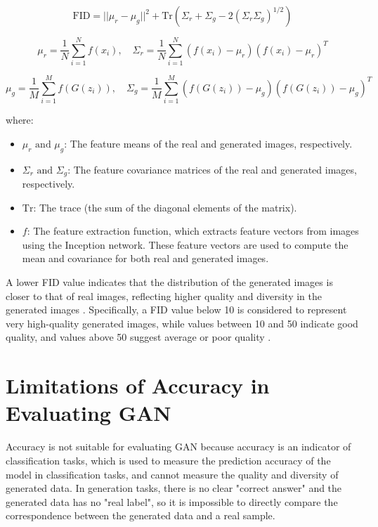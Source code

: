 \begin{equation}
    \text{FID} = || \mu_r - \mu_g ||^2 + \text{Tr}(\Sigma_r + \Sigma_g - 2(\Sigma_r \Sigma_g)^{1/2})
\end{equation}

\begin{equation}
    \mu_r = \frac{1}{N} \sum_{i=1}^{N} f(x_i), \quad \Sigma_r = \frac{1}{N} \sum_{i=1}^{N} (f(x_i) - \mu_r)(f(x_i) - \mu_r)^T
\end{equation}

\begin{equation}
    \mu_g = \frac{1}{M} \sum_{i=1}^{M} f(G(z_i)), \quad \Sigma_g = \frac{1}{M} \sum_{i=1}^{M} (f(G(z_i)) - \mu_g)(f(G(z_i)) - \mu_g)^T
\end{equation}

where:

\begin{itemize}
    \item \(\mu_r \text{ and } \mu_g\): The feature means of the real and generated images, respectively.
    \item \(\Sigma_r \text{ and } \Sigma_g\): The feature covariance matrices of the real and generated images, respectively.
    \item \(\text{Tr}\): The trace (the sum of the diagonal elements of the matrix).
    \item \(f\): The feature extraction function, which extracts feature vectors from images using the Inception network. These feature vectors are used to compute the mean and covariance for both real and generated images.
\end{itemize}

A lower FID value indicates that the distribution of the generated images is closer to that of real images, 
reflecting higher quality and diversity in the generated images \citep{10.1117/12.2673366}. 
Specifically, a FID value below 10 is considered to represent very high-quality generated images, 
while values between 10 and 50 indicate good quality, and values above 50 suggest average or poor quality \citep{10.1117/12.2673366}.


\section{Limitations of Accuracy in Evaluating GAN}
Accuracy is not suitable for evaluating GAN because accuracy is an indicator of classification tasks, 
which is used to measure the prediction accuracy of the model in classification tasks, and cannot 
measure the quality and diversity of generated data. In generation tasks, there is no clear 
"correct answer" and the generated data has no "real label", so it is impossible to directly 
compare the correspondence between the generated data and a real sample. 

